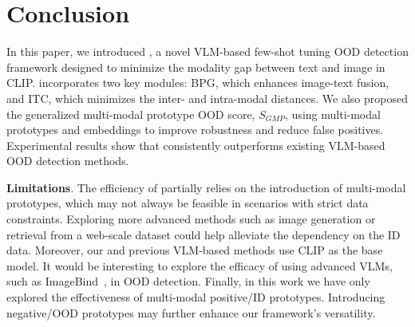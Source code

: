 \section{Conclusion}
In this paper, we introduced \ours, a novel VLM-based few-shot tuning OOD detection framework designed to minimize the modality gap between text and image in CLIP. 
\ours incorporates two key modules: BPG, which enhances image-text fusion, and ITC, which minimizes the inter- and intra-modal distances. 
We also proposed the generalized multi-modal prototype OOD score, $S_{\textit{GMP}}$, using multi-modal prototypes and embeddings to improve robustness and reduce false positives. 
Experimental results show that \ours consistently outperforms existing VLM-based OOD detection methods. 

\noindent
\textbf{Limitations}. 
The efficiency of \ours partially relies on the introduction of multi-modal prototypes, which may not always be feasible in scenarios with strict data constraints. 
Exploring more advanced methods such as image generation or retrieval from a web-scale dataset could help alleviate the dependency on the ID data. 
Moreover, our \ours and previous VLM-based methods use CLIP as the base model. 
It would be interesting to explore the efficacy of using advanced VLMs, such as ImageBind~\cite{girdhar_imagebind_2023}, in OOD detection.
Finally, in this work we have only explored the effectiveness of multi-modal positive/ID prototypes. Introducing negative/OOD prototypes may further enhance our framework's versatility.
